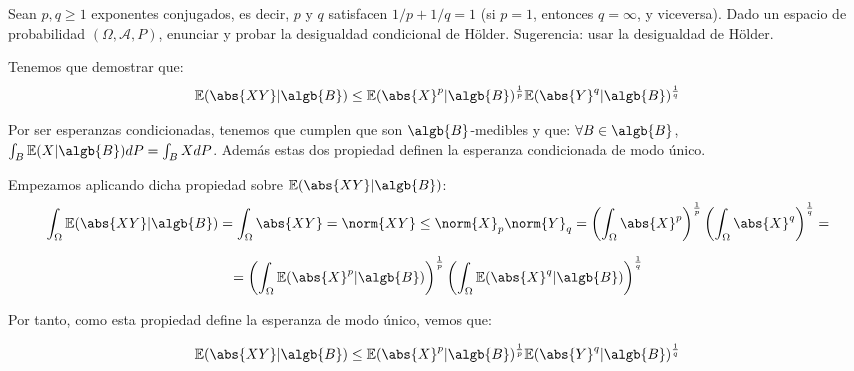 
\begin{problem}[3] Sean $p,q \ge 1$ exponentes conjugados, es decir, $p$ y $q$ satisfacen
$1/p + 1/q =1$ (si $p=1$, entonces $q = \infty$, y viceversa).
Dado un espacio de probabilidad  $(\Omega, \mathcal{A}, P)$, enunciar y probar la desigualdad condicional de 
H\"older. Sugerencia: usar la desigualdad de H\"older.
\solution

\begin{expla}
Tenemos que demostrar que:
\[
\mathbb{E}(\abs{XY}|\algb{B}) \leq \mathbb{E}(\abs{X}^p|\algb{B})^{\frac{1}{p}} \mathbb{E}(\abs{Y}^q|\algb{B})^{\frac{1}{q}}
\]

Por ser esperanzas condicionadas, tenemos que cumplen que son $\algb{B}$-medibles y que:
$\forall B \in \algb{B}$, $\int_{B}\mathbb{E}(X|\algb{B})dP=\int_{B}XdP$. Además estas dos propiedad definen la esperanza condicionada de modo único.

\end{expla}
Empezamos aplicando dicha propiedad sobre $\mathbb{E}(\abs{XY}|\algb{B})$:
\[
\int_{\Omega}\mathbb{E}(\abs{XY}|\algb{B}) = \int_{\Omega}\abs{XY} = \norm{XY} \leq \norm{X}_p \norm{Y}_q = \left( \int_{\Omega} \abs{X}^p \right)^{\frac{1}{p}} \left( \int_{\Omega} \abs{X}^q \right)^{\frac{1}{q}} =  
\]

\[
= \left( \int_{\Omega} \mathbb{E}(\abs{X}^p|\algb{B}) \right)^{\frac{1}{p}} \left( \int_{\Omega} \mathbb{E}(\abs{X}^q|\algb{B}) \right)^{\frac{1}{q}}
\]

Por tanto, como esta propiedad define la esperanza de modo único, vemos que:

\[
\mathbb{E}(\abs{XY}|\algb{B}) \leq \mathbb{E}(\abs{X}^p|\algb{B})^{\frac{1}{p}} \mathbb{E}(\abs{Y}^q|\algb{B})^{\frac{1}{q}}
\]

\end{problem}


